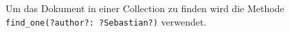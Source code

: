 Um das Dokument in einer Collection zu finden wird die Methode \\ \lstinline{find_one(?author?: ?Sebastian?)} verwendet.
